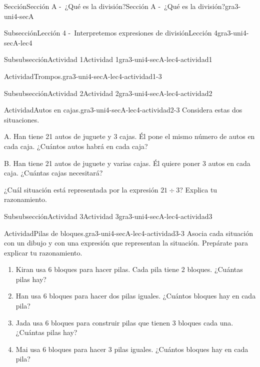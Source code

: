 \documentclass[twoside,10pt,]{article}
\begin{document}
\begin{sectionptx}{Sección}{Sección A -~¿Qué es la división?}{}{Sección A -~¿Qué es la división?}{}{}{gra3-uni4-secA}
\begin{subsectionptx}{Subsección}{Lección 4 -~Interpretemos expresiones de división}{}{Lección 4}{}{}{gra3-uni4-secA-lec4}
\begin{subsubsectionptx}{Subsubsección}{Actividad 1}{}{Actividad 1}{}{}{gra3-uni4-secA-lec4-actividad1}
\begin{activity}{Actividad}{Trompos.}{gra3-uni4-secA-lec4-actividad1-3}
\end{activity}%
\end{subsubsectionptx}
%
%
\typeout{************************************************}
\typeout{************************************************}
%
\begin{subsubsectionptx}{Subsubsección}{Actividad 2}{}{Actividad 2}{}{}{gra3-uni4-secA-lec4-actividad2}
\begin{activity}{Actividad}{Autos en cajas.}{gra3-uni4-secA-lec4-actividad2-3}%
Considera estas dos situaciones.%
\begin{sidebyside}{2}{0.05}{0.05}{0.1}%
\begin{sbspanel}{0.4}%
A. Han tiene 21 autos de juguete y 3 cajas. Él pone el mismo número de autos en cada caja. ¿Cuántos autos habrá en cada caja?%
\end{sbspanel}%
\begin{sbspanel}{0.4}%
\par
B. Han tiene 21 autos de juguete y varias cajas. Él quiere poner 3 autos en cada caja. ¿Cuántas cajas necesitará?%
\end{sbspanel}%
\end{sidebyside}%
\par
¿Cuál situación está representada por la expresión \(21\div 3\)? Explica tu razonamiento.%
\end{activity}%
\end{subsubsectionptx}
%
%
\typeout{************************************************}
\typeout{************************************************}
%
\begin{subsubsectionptx}{Subsubsección}{Actividad 3}{}{Actividad 3}{}{}{gra3-uni4-secA-lec4-actividad3}
\begin{activity}{Actividad}{Pilas de bloques.}{gra3-uni4-secA-lec4-actividad3-3}%
Asocia cada situación con un dibujo y con una expresión que representan la situación. Prepárate para explicar tu razonamiento.%
%
\begin{enumerate}
\item{}Kiran usa 6 bloques para hacer pilas. Cada pila tiene 2 bloques. ¿Cuántas pilas hay?%
\item{}Han usa 6 bloques para hacer dos pilas iguales. ¿Cuántos bloques hay en cada pila?%
\item{}Jada usa 6 bloques para construir pilas que tienen 3 bloques cada una. ¿Cuántas pilas hay?%
\item{}Mai usa 6 bloques para hacer 3 pilas iguales. ¿Cuántos bloques hay en cada pila?%

\end{enumerate}
\end{activity}
\end{subsubsectionptx}
\end{subsectionptx}
\end{sectionptx}
\end{document}
